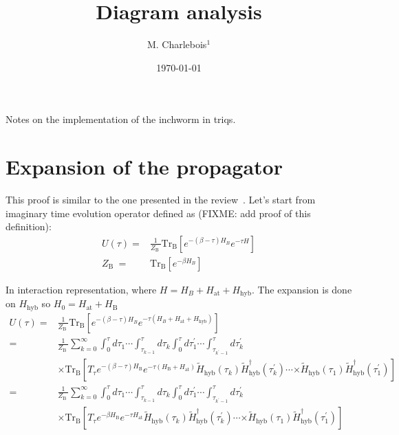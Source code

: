 \documentclass[10pt,letter]{article}
\begin{document}
\title{Diagram analysis}
\author{M. Charlebois$^{1}$}
\date{\today}


\newcommand{\bra}[1]{\langle #1 \vert}
\newcommand{\ket}[1]{\vert #1 \rangle}
\newcommand{\braket}[2]{\langle #1 \vert #2 \rangle}
\newcommand{\ZB}{Z_{\text {B }}}

Notes on the implementation of the inchworm in triqs.

\section{Expansion of the propagator}

This proof is similar to the one presented in the review~\cite{gull_continuous-time_2011}.
Let's start from imaginary time evolution operator defined as (FIXME: add proof of this definition):
\begin{align}
U(\tau)=& \frac{1}{\ZB} \operatorname{Tr_B} [e^{-(\beta-\tau) H_B } e^{-\tau H }] 
\\
\ZB =& \operatorname{Tr_B} [e^{-\beta H_B }] 
\end{align}

In interaction representation, where $H=H_B+H_\text{at}+H_\text{hyb}$. The expansion is done on $H_\text{hyb}$ so $H_0 = H_\text{at} + H_\text{B}$
\begin{align}
U(\tau)=& \frac{1}{\ZB} \operatorname{Tr_B} [e^{-(\beta - \tau) H_B } e^{-\tau (H_B + H_{\mathrm{at}} + H_\text{hyb}) }]  
\\ 
=&  \frac{1}{\ZB} 
\sum_{k=0}^{\infty} \int_{0}^{\tau} d \tau_{1} \cdots \int_{\tau_{k-1}}^{\tau} d \tau_{k} \int_{0}^{\tau} d \tau_{1}^{\prime} \cdots \int_{\tau_{k^{\prime}-1}}^{\tau} d \tau_{k}^{\prime} 
\nonumber
\\
& \times \operatorname{Tr_B}\left[T_{\tau} e^{-(\beta-\tau) H_\mathrm{B}} e^{-\tau (H_\mathrm B + H_{\mathrm{at}})} \tilde{H}_{\mathrm{hyb}}\left(\tau_{k}\right) \tilde{H}_{\mathrm{hyb}}^{\dagger}\left(\tau_{k}^{\prime}\right) \cdots\right. \left.\times \tilde{H}_{\mathrm{hyb}}\left(\tau_{1}\right) \tilde{H}_{\mathrm{hyb}}^{\dagger}\left(\tau_{1}^{\prime}\right)\right]
\\ 
=&  \frac{1}{\ZB} 
\sum_{k=0}^{\infty} \int_{0}^{\tau} d \tau_{1} \cdots \int_{\tau_{k-1}}^{\tau} d \tau_{k} \int_{0}^{\tau} d \tau_{1}^{\prime} \cdots \int_{\tau_{k^{\prime}-1}}^{\tau} d \tau_{k}^{\prime} 
\nonumber
\\
& \times \operatorname{Tr_B}\left[T_{\tau} e^{-\beta H_\mathrm{B}} e^{-\tau H_{\mathrm{at}}} \tilde{H}_{\mathrm{hyb}}\left(\tau_{k}\right) \tilde{H}_{\mathrm{hyb}}^{\dagger}\left(\tau_{k}^{\prime}\right) \cdots\right. \left.\times \tilde{H}_{\mathrm{hyb}}\left(\tau_{1}\right) \tilde{H}_{\mathrm{hyb}}^{\dagger}\left(\tau_{1}^{\prime}\right)\right]
\end{align}
\end{document}
